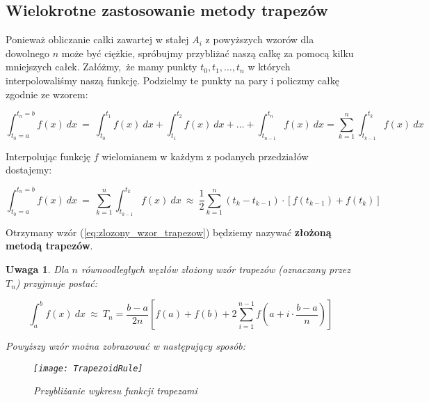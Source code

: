 \documentclass{article}
\newtheorem{remark}{Uwaga}
\begin{document}


\subsection{Wielokrotne zastosowanie metody trapezów}

Ponieważ obliczanie całki zawartej w stałej $A_i$ z powyższych wzorów dla dowolnego $n$ może być ciężkie, spróbujmy przybliżać naszą całkę za pomocą kilku mniejszych całek. Załóżmy, że mamy punkty $t_0, t_1, \ldots, t_n$ w których interpolowaliśmy naszą funkcję. Podzielmy te punkty na pary i policzmy całkę zgodnie ze wzorem:

\begin{equation}
	\int_{t_0 = a}^{t_n = b} f(x) \ dx \ = \ \int_{t_0}^{t_1} f(x) \ dx + \int_{t_1}^{t_2} f(x) \ dx + \ldots + \int_{t_{n-1}}^{t_n} f(x) \ dx = \sum_{k=1}^{n} \int_{t_{k-1}}^{t_k} f(x) \ dx
\end{equation}

Interpolując funkcję $f$ wielomianem w każdym z podanych przedziałów dostajemy:

\begin{equation}
\label{eq:zlozony_wzor_trapezow}
	\int_{t_0 = a}^{t_n = b} f(x) \ dx \ = \ \sum_{k=1}^{n} \int_{t_{k-1}}^{t_k} f(x) \ dx \ \approx \ \frac{1}{2} \sum_{k=1}^{n}  \left( t_k - t_{k-1} \right) \cdot \left [ f \left( t_{k-1} \right) + f \left( t_k \right) \right ]
\end{equation}

Otrzymany wzór (\ref{eq:zlozony_wzor_trapezow})  będziemy nazywać \textbf{złożoną metodą trapezów}.

\begin{remark}
\label{rem:zlozonywzorrtrapezowownoodlegle}
Dla $n$ równoodległych węzłów złożony wzór trapezów (oznaczany przez $T_n$) przyjmuje postać:

$$\int_{a}^{b} f(x) \ dx \ \approx \ T_n = \frac{b-a}{2n} \left [ f(a) + f(b) + 2 \sum_{i=1}^{n-1} f \left( a + i \cdot \frac{b-a}{n}  \right) \right ] $$

Powyższy wzór można zobrazować w następujący sposób:
\begin{figure}[h!]
	\centering
	\texttt{[image: TrapezoidRule]}
	\caption{Przybliżanie wykresu funkcji trapezami}
\end{figure}

\end{remark}
\end{document}
